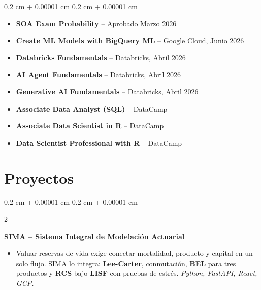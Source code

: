 \documentclass[10pt, letterpaper]{article}
\newenvironment{highlights}{
    \begin{itemize}[
        topsep=0.02 cm,
        parsep=0.05 cm,
        partopsep=0pt,
        itemsep=0pt,
        leftmargin=0.4 cm + 10pt
    ]
}{
    \end{itemize}
}
\newenvironment{highlightsforbulletentries}{
    \begin{itemize}[
        topsep=0.02 cm,
        parsep=0.02 cm,
        partopsep=0pt,
        itemsep=0pt,
        leftmargin=10pt
    ]
}{
    \end{itemize}
}
\newenvironment{onecolentry}{
    \begin{adjustwidth}{
        0.2 cm + 0.00001 cm
    }{
        0.2 cm + 0.00001 cm
    }
}{
    \end{adjustwidth}
}
\newenvironment{twocolentrynarrow}[2][]{
    \onecolentry
    \def\secondColumn{#2}
    \setcolumnwidth{\fill, 2.2 cm}
    \begin{paracol}{2}
}{
    \switchcolumn \raggedleft \secondColumn
    \end{paracol}
    \endonecolentry
}
\newcommand{\hl}[1]{\textcolor{primaryColor}{\textbf{#1}}}
\let\hrefWithoutArrow\href
\renewcommand{\href}[2]{\hrefWithoutArrow{#1}{\ifthenelse{\equal{#2}{}}{ }{#2 }\raisebox{.15ex}{\footnotesize \faExternalLink*}}}
\begin{document}
    \begin{onecolentry}
        \begin{highlightsforbulletentries}
            \item \textbf{SOA Exam Probability} -- Aprobado Marzo 2026 \href{https://drive.google.com/file/d/1rt3emgBnPpQi7NiXkBQeA5WwJTV0JuAf/view?usp=sharing}{}
            \item \textbf{Create ML Models with BigQuery ML} -- Google Cloud, Junio 2026 \href{https://www.credly.com/badges/627e036d-0757-4d8a-9dca-6a40a8088f3c}{}
            \item \textbf{Databricks Fundamentals} -- Databricks, Abril 2026 \href{https://credentials.databricks.com/45f31d0f-ca80-4e3a-80c1-ede89826f6ce}{}
            \item \textbf{AI Agent Fundamentals} -- Databricks, Abril 2026 \href{https://credentials.databricks.com/14950fb9-6260-46d2-b78e-8ec864397479}{}
            \item \textbf{Generative AI Fundamentals} -- Databricks, Abril 2026 \href{https://credentials.databricks.com/9e3a7d69-10f5-4474-901f-d35e73bb69b2}{}
            \item \textbf{Associate Data Analyst (SQL)} -- DataCamp \href{https://drive.google.com/file/d/1EqzyjRkWOJBlU9zUTpkcUcj6QtuXRZfK/view?usp=drive_link}{}
            \item \textbf{Associate Data Scientist in R} -- DataCamp \href{https://drive.google.com/file/d/1xVLk15A1LBbyXH1fZnd4eBTaJ4d8FLLO/view?usp=drive_link}{}
            \item \textbf{Data Scientist Professional with R} -- DataCamp \href{https://drive.google.com/file/d/1Woe6xqxofloFZ9uM2f5VsdGxY-WQWCRI/view?usp=drive_link}{}
        \end{highlightsforbulletentries}
    \end{onecolentry}
\endgroup



    \section{Proyectos}
\begingroup\small

\begin{twocolentrynarrow}{\href{https://sima.gonor.me}{app live}}
    \textbf{SIMA -- Sistema Integral de Modelación Actuarial}
    \begin{highlights}
        \item Valuar reservas de vida exige conectar mortalidad, producto y capital en un solo flujo. SIMA lo integra: \hl{Lee-Carter}, conmutación, \hl{BEL} para tres productos y \hl{RCS} bajo \hl{LISF} con pruebas de estrés. \textit{Python, FastAPI, React, GCP.}
    \end{highlights}
\end{twocolentrynarrow}
\end{document}
